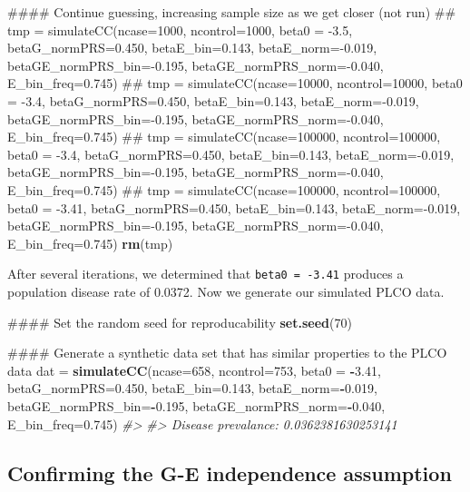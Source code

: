 \documentclass[]{article}
\newenvironment{Shaded}{\begin{snugshade}}{\end{snugshade}}
\newcommand{\KeywordTok}[1]{\textcolor[rgb]{0.13,0.29,0.53}{\textbf{#1}}}
\newcommand{\DataTypeTok}[1]{\textcolor[rgb]{0.13,0.29,0.53}{#1}}
\newcommand{\DecValTok}[1]{\textcolor[rgb]{0.00,0.00,0.81}{#1}}
\newcommand{\FloatTok}[1]{\textcolor[rgb]{0.00,0.00,0.81}{#1}}
\newcommand{\StringTok}[1]{\textcolor[rgb]{0.31,0.60,0.02}{#1}}
\newcommand{\CommentTok}[1]{\textcolor[rgb]{0.56,0.35,0.01}{\textit{#1}}}
\newcommand{\OperatorTok}[1]{\textcolor[rgb]{0.81,0.36,0.00}{\textbf{#1}}}
\newcommand{\NormalTok}[1]{#1}
\begin{document}
\begin{Shaded}
\begin{Highlighting}[]
\NormalTok{#### Continue guessing, increasing sample size as we get closer (not run)}
\NormalTok{## tmp = simulateCC(ncase=1000, ncontrol=1000, beta0 = -3.5, betaG_normPRS=0.450, betaE_bin=0.143, betaE_norm=-0.019, betaGE_normPRS_bin=-0.195, betaGE_normPRS_norm=-0.040, E_bin_freq=0.745)}
\NormalTok{## tmp = simulateCC(ncase=10000, ncontrol=10000, beta0 = -3.4, betaG_normPRS=0.450, betaE_bin=0.143, betaE_norm=-0.019, betaGE_normPRS_bin=-0.195, betaGE_normPRS_norm=-0.040, E_bin_freq=0.745)}
\NormalTok{## tmp = simulateCC(ncase=100000, ncontrol=100000, beta0 = -3.4, betaG_normPRS=0.450, betaE_bin=0.143, betaE_norm=-0.019, betaGE_normPRS_bin=-0.195, betaGE_normPRS_norm=-0.040, E_bin_freq=0.745)}
\NormalTok{## tmp = simulateCC(ncase=100000, ncontrol=100000, beta0 = -3.41, betaG_normPRS=0.450, betaE_bin=0.143, betaE_norm=-0.019, betaGE_normPRS_bin=-0.195, betaGE_normPRS_norm=-0.040, E_bin_freq=0.745)}
\KeywordTok{rm}\NormalTok{(tmp)}
\end{Highlighting}
\end{Shaded}

After several iterations, we determined that \texttt{beta0 = -3.41}
produces a population disease rate of 0.0372. Now we generate our
simulated PLCO data.

\begin{Shaded}
\begin{Highlighting}[]
\NormalTok{#### Set the random seed for reproducability}
\KeywordTok{set.seed}\NormalTok{(}\DecValTok{70}\NormalTok{)}

\NormalTok{#### Generate a synthetic data set that has similar properties to the PLCO data}
\NormalTok{dat =}\StringTok{ }\KeywordTok{simulateCC}\NormalTok{(}\DataTypeTok{ncase=}\DecValTok{658}\NormalTok{, }\DataTypeTok{ncontrol=}\DecValTok{753}\NormalTok{, }\DataTypeTok{beta0 =} \OperatorTok{-}\FloatTok{3.41}\NormalTok{, }\DataTypeTok{betaG_normPRS=}\FloatTok{0.450}\NormalTok{, }
                 \DataTypeTok{betaE_bin=}\FloatTok{0.143}\NormalTok{, }\DataTypeTok{betaE_norm=}\OperatorTok{-}\FloatTok{0.019}\NormalTok{, }\DataTypeTok{betaGE_normPRS_bin=}\OperatorTok{-}\FloatTok{0.195}\NormalTok{, }
                 \DataTypeTok{betaGE_normPRS_norm=}\OperatorTok{-}\FloatTok{0.040}\NormalTok{, }\DataTypeTok{E_bin_freq=}\FloatTok{0.745}\NormalTok{)}
\CommentTok{#> }
\CommentTok{#> Disease prevalance: 0.0362381630253141}
\end{Highlighting}
\end{Shaded}

\subsection{Confirming the G-E independence assumption}
\end{document}
